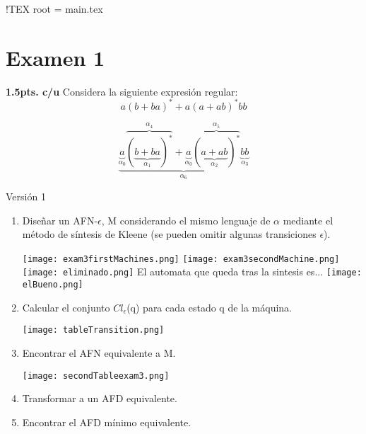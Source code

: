 !TEX root = main.tex
\renewcommand{\labelenumi}{\alph{enumi})}

\section*{Examen 1}

\begin{questions}
\question \textbf{1.5pts. c/u} Considera la siguiente expresi\'on regular: 
\begin{equation}
    a(b + ba)^{*} + a(a + ab)^{*}bb
\end{equation}

\begin{equation}
    \underbrace{\underbrace{a}_{\alpha_{0}}\overbrace{(\underbrace{b + ba}_{\alpha_{1}})^{*}}^{\alpha_{4}} + \underbrace{a}_{\alpha_{0}}\overbrace{(\underbrace{a + ab}_{\alpha_{2}})^{*}}^{\alpha_{5}}\underbrace{bb}_{\alpha_{3}}}_{\alpha_{6}}
\end{equation}


Versi\'on 1 
\begin{enumerate}
    \item Diseñar un AFN-$\epsilon$, M considerando el mismo lenguaje de $\alpha$ mediante el método de síntesis de
    Kleene (se pueden omitir algunas transiciones $\epsilon$).
    \begin{center}
        \texttt{[image: exam3firstMachines.png]}
        \texttt{[image: exam3secondMachine.png]}
        \texttt{[image: eliminado.png]}
        El automata que queda tras la sintesis es...
        \texttt{[image: elBueno.png]}
    \end{center}

    \item Calcular el conjunto $Cl_{\epsilon}$(q) para cada estado q de la m\'aquina.
    \begin{center}
        \texttt{[image: tableTransition.png]}
    \end{center}
    \item Encontrar el AFN equivalente a M.
    \begin{center}
        \texttt{[image: secondTableexam3.png]}    
    \end{center}
    
    \item Transformar a un AFD equivalente.
    \item Encontrar el AFD m\'inimo equivalente.        
\end{enumerate}


\end{questions}
